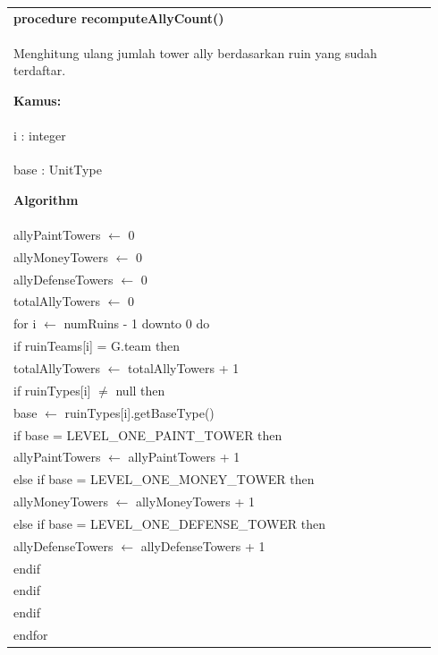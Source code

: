 \documentclass{article}
\newenvironment{pseudobox}
{
\centering
\begin{longtable}{|p{0.94\linewidth}|}
\hline
}
{
\\ \hline
\end{longtable}
\vspace{0.05cm}
}
\begin{document}
\begin{pseudobox}
\textbf{procedure recomputeAllyCount()} \\
{ Menghitung ulang jumlah tower ally berdasarkan ruin yang sudah terdaftar. }

\textbf{Kamus:} \\
\hspace*{1em} i : integer \\
\hspace*{1em} base : UnitType

\textbf{Algorithm} \\
\hspace*{1em} allyPaintTowers $\leftarrow$ 0 \\
\hspace*{1em} allyMoneyTowers $\leftarrow$ 0 \\
\hspace*{1em} allyDefenseTowers $\leftarrow$ 0 \\
\hspace*{1em} totalAllyTowers $\leftarrow$ 0 \\

\hspace*{1em} for i $\leftarrow$ numRuins - 1 downto 0 do \\
\hspace*{2em} if ruinTeams[i] = G.team then \\
\hspace*{3em} totalAllyTowers $\leftarrow$ totalAllyTowers + 1 \\
\hspace*{3em} if ruinTypes[i] $\neq$ null then \\
\hspace*{4em} base $\leftarrow$ ruinTypes[i].getBaseType() \\
\hspace*{4em} if base = LEVEL\_ONE\_PAINT\_TOWER then \\
\hspace*{5em} allyPaintTowers $\leftarrow$ allyPaintTowers + 1 \\
\hspace*{4em} else if base = LEVEL\_ONE\_MONEY\_TOWER then \\
\hspace*{5em} allyMoneyTowers $\leftarrow$ allyMoneyTowers + 1 \\
\hspace*{4em} else if base = LEVEL\_ONE\_DEFENSE\_TOWER then \\
\hspace*{5em} allyDefenseTowers $\leftarrow$ allyDefenseTowers + 1 \\
\hspace*{4em} endif \\
\hspace*{3em} endif \\
\hspace*{2em} endif \\
\hspace*{1em} endfor
\end{pseudobox}
\end{document}
